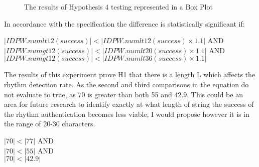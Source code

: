 \documentclass{article}
\begin{document}
\begin{figure} [H]
    \centering
    \caption{The results of Hypothesis 4 testing represented in a Box Plot}
    \label{fig:boxPlotHyp4}
\end{figure}

In accordance with the specification the difference is statistically significant if: 
\begin{center}
    $ |IDPW.numlt12(success)| < |IDPW.numlt12(success) \times 1.1| $ AND \\
    $ |IDPW.numgt12(success)| < |IDPW.numlt20(success) \times 1.1| $ AND \\
    $ |IDPW.numgt12(success)| < |IDPW.numlt36(success) \times 1.1| $ \\
\end{center} 

The results of this experiment prove H1 that there	is	a length	L	which	affects	the	rhythm	detection	rate. As the second and third comparisons in the equation do not evaluate to true, as 70 is greater than both 55 and 42.9. This could be an area for future research to identify exactly at what length of string the success of the rhythm authentication becomes less viable, I would propose however it is in the range of 20-30 characters. 

\begin{center}
    $ |70| < |77| $ AND \\
    $ |70| < |55| $ AND \\
    $ |70| < |42.9| $ \\
\end{center} 
\end{document}
